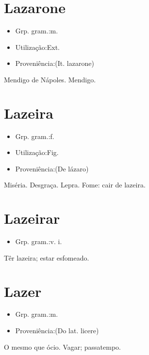 \section{Lazarone}
\begin{itemize}
\item {Grp. gram.:m.}
\end{itemize}
\begin{itemize}
\item {Utilização:Ext.}
\end{itemize}
\begin{itemize}
\item {Proveniência:(It. \textunderscore lazarone\textunderscore )}
\end{itemize}
Mendigo de Nápoles.
Mendigo.
\section{Lazeira}
\begin{itemize}
\item {Grp. gram.:f.}
\end{itemize}
\begin{itemize}
\item {Utilização:Fig.}
\end{itemize}
\begin{itemize}
\item {Proveniência:(De \textunderscore lázaro\textunderscore )}
\end{itemize}
Miséria.
Desgraça.
Lepra.
Fome: \textunderscore cair de lazeira\textunderscore .
\section{Lazeirar}
\begin{itemize}
\item {Grp. gram.:v. i.}
\end{itemize}
Têr lazeira; estar esfomeado.
\section{Lazer}
\begin{itemize}
\item {Grp. gram.:m.}
\end{itemize}
\begin{itemize}
\item {Proveniência:(Do lat. \textunderscore licere\textunderscore )}
\end{itemize}
O mesmo que ócio.
Vagar; passatempo.

